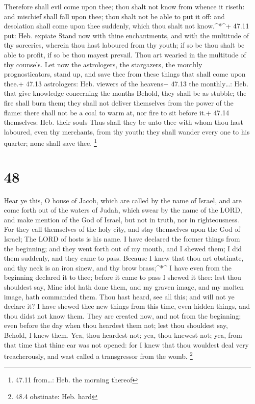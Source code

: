  Therefore shall evil come upon thee; thou shalt not know
from whence it riseth: and mischief shall fall upon thee; thou shalt not
be able to put it off: and desolation shall come upon thee suddenly,
which thou shalt not know.\^{}*\^{}+ 47.11 put: Heb. expiate
 Stand now with thine enchantments, and with the multitude
of thy sorceries, wherein thou hast laboured from thy youth; if so be
thou shalt be able to profit, if so be thou mayest prevail.
 Thou art wearied in the multitude of thy counsels. Let now
the astrologers, the stargazers, the monthly prognosticators, stand up,
and save thee from these things that shall come upon thee.+ 47.13
astrologers: Heb. viewers of the heavens+ 47.13 the monthly\ldots: Heb.
that give knowledge concerning the months  Behold, they
shall be as stubble; the fire shall burn them; they shall not deliver
themselves from the power of the flame: there shall not be a coal to
warm at, nor fire to sit before it.+ 47.14 themselves: Heb. their souls
 Thus shall they be unto thee with whom thou hast laboured,
even thy merchants, from thy youth: they shall wander every one to his
quarter; none shall save thee. \footnote{47.11 from\ldots: Heb. the
  morning thereof}

\hypertarget{section-47}{%
\section{48}\label{section-47}}

 Hear ye this, O house of Jacob, which are called by the
name of Israel, and are come forth out of the waters of Judah, which
swear by the name of the LORD, and make mention of the God of Israel,
but not in truth, nor in righteousness.  For they call
themselves of the holy city, and stay themselves upon the God of Israel;
The LORD of hosts is his name.  I have declared the former
things from the beginning; and they went forth out of my mouth, and I
shewed them; I did them suddenly, and they came to pass. 
Because I knew that thou art obstinate, and thy neck is an iron sinew,
and thy brow brass;\^{}*\^{}  I have even from the beginning
declared it to thee; before it came to pass I shewed it thee: lest thou
shouldest say, Mine idol hath done them, and my graven image, and my
molten image, hath commanded them.  Thou hast heard, see all
this; and will not ye declare it? I have shewed thee new things from
this time, even hidden things, and thou didst not know them.
 They are created now, and not from the beginning; even
before the day when thou heardest them not; lest thou shouldest say,
Behold, I knew them.  Yea, thou heardest not; yea, thou
knewest not; yea, from that time that thine ear was not opened: for I
knew that thou wouldest deal very treacherously, and wast called a
transgressor from the womb. \footnote{48.4 obstinate: Heb. hard}

